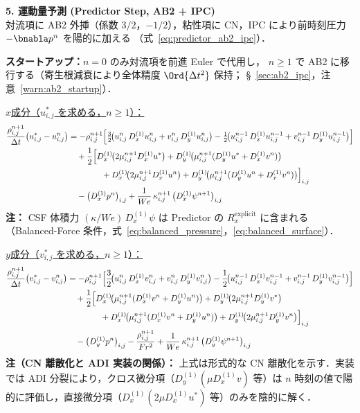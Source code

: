 \textbf{5. 運動量予測 (Predictor Step, AB2 + IPC)} \\
対流項に AB2 外挿（係数 $3/2$，$-1/2$），粘性項に CN，IPC により前時刻圧力 $-\bnabla p^n$ を陽的に加える
（式~\eqref{eq:predictor_ab2_ipc}）．

\noindent\textbf{スタートアップ：}$n=0$ のみ対流項を前進 Euler で代用し，
$n \ge 1$ で AB2 に移行する（寄生根減衰により全体精度 $\Ord{\Delta t^2}$ 保持；
§~\ref{sec:ab2_ipc}，注意~\ref{warn:ab2_startup}）．

\medskip
\underline{$x$成分（$u^*_{i,j}$ を求める，$n \ge 1$）：}
\begin{align*}
  \frac{\rho^{n+1}_{i,j}}{\Delta t}\bigl(u^*_{i,j} - u^n_{i,j}\bigr)
  &= -\rho^{n+1}_{i,j}\Bigl[
      \tfrac{3}{2}\!\bigl(u^n_{i,j}\,D_x^{(1)} u^n_{i,j} + v^n_{i,j}\,D_y^{(1)} u^n_{i,j}\bigr)
      -\tfrac{1}{2}\!\bigl(u^{n-1}_{i,j}\,D_x^{(1)} u^{n-1}_{i,j} + v^{n-1}_{i,j}\,D_y^{(1)} u^{n-1}_{i,j}\bigr)
    \Bigr] \\
  &\quad + \frac{1}{2}\Bigl[D_x^{(1)}\!\bigl(2\mu^{n+1}_{i,j} D_x^{(1)} u^*\bigr)
                          + D_y^{(1)}\!\bigl(\mu^{n+1}_{i,j}(D_y^{(1)} u^* + D_x^{(1)} v^n)\bigr) \\
  &\qquad\qquad    + D_x^{(1)}\!\bigl(2\mu^{n+1}_{i,j} D_x^{(1)} u^n\bigr)
                          + D_y^{(1)}\!\bigl(\mu^{n+1}_{i,j}(D_y^{(1)} u^n + D_x^{(1)} v^n)\bigr)\Bigr]_{i,j} \\
  &\quad - \bigl(D_x^{(1)} p^n\bigr)_{i,j}
         + \frac{1}{We}\,\kappa^{n+1}_{i,j}\,\bigl(D_x^{(1)}\psi^{n+1}\bigr)_{i,j}
\end{align*}
\textbf{注：} CSF 体積力 $(\kappa/We)\,D_x^{(1)}\psi$ は Predictor の $R^{\text{explicit}}_x$ に含まれる
（Balanced-Force 条件，式~\eqref{eq:balanced_pressure}，\eqref{eq:balanced_surface}）．

\underline{$y$成分（$v^*_{i,j}$ を求める，$n \ge 1$）：}
\begin{align*}
  \frac{\rho^{n+1}_{i,j}}{\Delta t}\bigl(v^*_{i,j} - v^n_{i,j}\bigr)
  &= -\rho^{n+1}_{i,j}\Bigl[
      \frac{3}{2}\!\bigl(u^n_{i,j}\,D_x^{(1)} v^n_{i,j} + v^n_{i,j}\,D_y^{(1)} v^n_{i,j}\bigr)
      -\frac{1}{2}\!\bigl(u^{n-1}_{i,j}\,D_x^{(1)} v^{n-1}_{i,j} + v^{n-1}_{i,j}\,D_y^{(1)} v^{n-1}_{i,j}\bigr)
    \Bigr] \\
  &\quad + \frac{1}{2}\Bigl[D_x^{(1)}\!\bigl(\mu^{n+1}_{i,j}(D_x^{(1)} v^n + D_y^{(1)} u^n)\bigr)
                          + D_y^{(1)}\!\bigl(2\mu^{n+1}_{i,j} D_y^{(1)} v^*\bigr) \\
  &\qquad\qquad    + D_x^{(1)}\!\bigl(\mu^{n+1}_{i,j}(D_x^{(1)} v^n + D_y^{(1)} u^n)\bigr)
                          + D_y^{(1)}\!\bigl(2\mu^{n+1}_{i,j} D_y^{(1)} v^n\bigr)\Bigr]_{i,j} \\
  &\quad - \bigl(D_y^{(1)} p^n\bigr)_{i,j}
         - \frac{\rho^{n+1}_{i,j}}{Fr^2}
         + \frac{1}{We}\,\kappa^{n+1}_{i,j}\,\bigl(D_y^{(1)}\psi^{n+1}\bigr)_{i,j}
\end{align*}
\noindent\textbf{注（CN 離散化と ADI 実装の関係）：}
上式は形式的な CN 離散化を示す．実装では ADI 分裂により，クロス微分項（$D_y^{(1)}(\mu D_x^{(1)} v)$ 等）は $n$ 時刻の値で陽的に評価し，直接微分項（$D_x^{(1)}(2\mu D_x^{(1)} u^*)$ 等）のみを陰的に解く．


